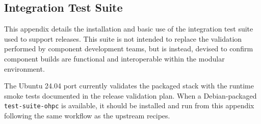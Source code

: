 \clearpage
\subsection{Integration Test Suite}  \label{appendix:test_suite}

This appendix details the installation and basic use of the integration test
suite used to support \OHPC{} releases. This suite is not intended to replace
the validation performed by component development teams, but is instead,
devised to confirm component builds are functional and interoperable within
the modular \OHPC{} environment.

The Ubuntu 24.04 port currently validates the packaged stack with the runtime
smoke tests documented in the release validation plan. When a Debian-packaged
\texttt{test-suite-ohpc} is available, it should be installed and run from this
appendix following the same workflow as the upstream recipes.

